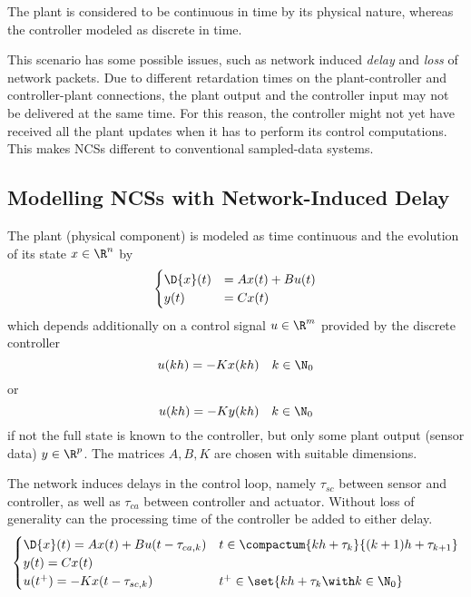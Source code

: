 
    The plant is considered to be continuous in time by its physical nature, whereas the controller modeled as discrete in time.

    This scenario has some possible issues, such as network induced \emph{delay} and \emph{loss} of network packets.
    Due to different retardation times on the plant-controller and controller-plant connections, the plant output and the controller input may not be delivered at the same time. For this reason, the controller might not yet have received all the plant updates when it has to perform its control computations. This makes NCSs different to conventional sampled-data systems.

    \subsection{Modelling NCSs with Network-Induced Delay}
        The plant (physical component) is modeled as time continuous and the evolution of its state $x\in\R^{n}$ by
        \begin{equation*}
            \begin{cases}
                \D{x}(t) &= Ax(t) + Bu(t) \\
                y(t) &= Cx(t)
            \end{cases}
        \end{equation*}
        which depends additionally on a control signal $u\in\R^{m}$ provided by the discrete controller
        \begin{equation*}
            u(kh) = -Kx(kh)\quad k\in\N_0
        \end{equation*}
        or
        \begin{equation*}
            u(kh) = -Ky(kh)\quad k\in\N_0
        \end{equation*}
        if not the full state is known to the controller, but only some plant output (sensor data) $y\in\R^{p}$.
        The matrices $A, B, K$ are chosen with suitable dimensions. 

        The network induces delays in the control loop, namely $\tau_{sc}$ between sensor and controller, as well as $\tau_{ca}$ between controller and actuator. Without loss of generality can the processing time of the controller be added to either delay.
        \begin{equation*}
            \begin{cases}
                \D{x}(t) = Ax(t) + Bu(t-\tau_{ca,k}) &
                t\in\compactum{kh+\tau_k}{(k+1)h+\tau_{k+1}}\\
                y(t) = Cx(t) &\\
                u(t^+) = -Kx(t-\tau_{sc,k}) &
                t^+\in\set{kh+\tau_k\with k\in\N_0}
            \end{cases}
        \end{equation*}


